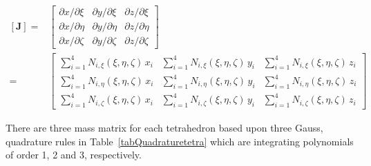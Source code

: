 \begin{equation}
\begin{aligned}
\left[\mathbf{J}\right]= &
\begin{bmatrix}
\partial x / \partial\xi & \partial y / \partial\xi & \partial z / \partial\xi\\
\partial x / \partial\eta & \partial y / \partial\eta & \partial z / \partial\eta \\
\partial x / \partial\zeta & \partial y / \partial\zeta & \partial z / \partial\zeta 
\end{bmatrix}\\
  = & \begin{bmatrix}
\sum\nolimits_{i=1}^4 N_{i,\xi} (\xi,\eta,\zeta) \, x_i & \sum\nolimits_{i=1}^4 N_{i,\xi} (\xi,\eta,\zeta) \, y_i &
\sum\nolimits_{i=1}^4 N_{i,\xi} (\xi,\eta,\zeta) \, z_i\\
\sum\nolimits_{i=1}^4 N_{i,\eta} (\xi,\eta,\zeta) \, x_i & \sum\nolimits_{i=1}^4 N_{i,\eta} (\xi,\eta,\zeta) \, y_i &
\sum\nolimits_{i=1}^4 N_{i,\eta} (\xi,\eta,\zeta) \, z_i\\
\sum\nolimits_{i=1}^4 N_{i,\zeta} (\xi,\eta,\zeta) \, x_i & \sum\nolimits_{i=1}^4 N_{i,\zeta} (\xi,\eta,\zeta) \, y_i &
\sum\nolimits_{i=1}^4 N_{i,\zeta} (\xi,\eta,\zeta) \, z_i
\end{bmatrix}
\end{aligned}
\label{jacobiantet}
\end{equation}

There are three mass matrix for each tetrahedron based upon three Gauss, quadrature rules in Table~\ref{tabQuadraturetetra} which are integrating polynomials of order 1, 2 and 3, respectively. 

